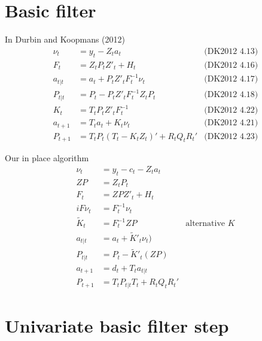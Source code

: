 \documentclass{article}
\begin{document}
\section{Basic filter}
In Durbin and Koopmans (2012)
\begin{align*}
  \nu_t &= y_t - Z_t a_t & \mbox{(DK2012 4.13)}\\
  F_t &= Z_tP_tZ'_t + H_t & \mbox{(DK2012 4.16)}\\
  a_{t|t} &= a_t + P_tZ'_t F^{-1}_t\nu_t & \mbox{(DK2012 4.17)}\\
  P_{t|t} &= P_t - P_tZ'_t F^{-1}_tZ_tP_t & \mbox{(DK2012 4.18)}\\
  K_t &= T_tP_tZ'_t F^{-1}_t & \mbox{(DK2012 4.22)}\\
  a_{t+1} &= T_ta_t + K_t\nu_t & \mbox{(DK2012 4.21)}\\
  P_{t+1} &= T_tP_t(T_t - K_tZ_t)' + R_tQ_tR_t' & \mbox{(DK2012 4.23)}
\end{align*}

Our in place algorithm
\begin{align*}
  \nu_t &= y_t - c_t - Z_t a_t \\
  ZP &= Z_tP_t \\
  F_t &= ZPZ'_t + H_t \\
  iF\nu_t &= F^{-1}_t\nu_t\\
  \tilde K_t &= F^{-1}_tZP & \mbox{alternative } K\\           
  a_{t|t} &= a_t + \tilde K'_t\nu_t)  \\
  P_{t|t} &= P_t - \tilde K'_t (ZP) \\
  a_{t+1} &= d_t + T_ta_{t|t}\\
  P_{t+1} &= T_tP_{t|t}T_t + R_tQ_tR_t' 
\end{align*}

\section{Univariate basic filter step}
\end{document}
